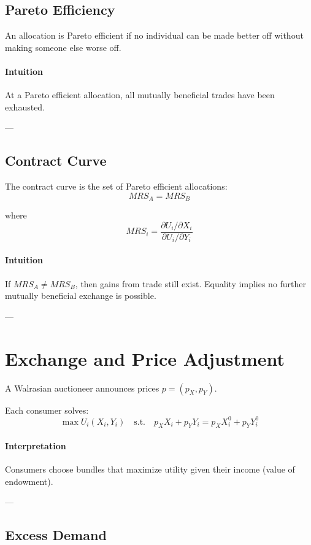 \subsection{Pareto Efficiency}

An allocation is Pareto efficient if no individual can be made better off without making someone else worse off.

\paragraph{Intuition}
At a Pareto efficient allocation, all mutually beneficial trades have been exhausted.

---

\subsection{Contract Curve}

The contract curve is the set of Pareto efficient allocations:
\[
MRS_A = MRS_B
\]

where
\[
MRS_i = \frac{\partial U_i / \partial X_i}{\partial U_i / \partial Y_i}
\]

\paragraph{Intuition}
If $MRS_A \neq MRS_B$, then gains from trade still exist.  
Equality implies no further mutually beneficial exchange is possible.

---

\section{Exchange and Price Adjustment}

A Walrasian auctioneer announces prices $p = (p_X, p_Y)$.

Each consumer solves:
\[
\max U_i(X_i, Y_i)
\quad \text{s.t.} \quad
p_X X_i + p_Y Y_i = p_X X_i^0 + p_Y Y_i^0
\]

\paragraph{Interpretation}
Consumers choose bundles that maximize utility given their income (value of endowment).

---

\subsection{Excess Demand}


